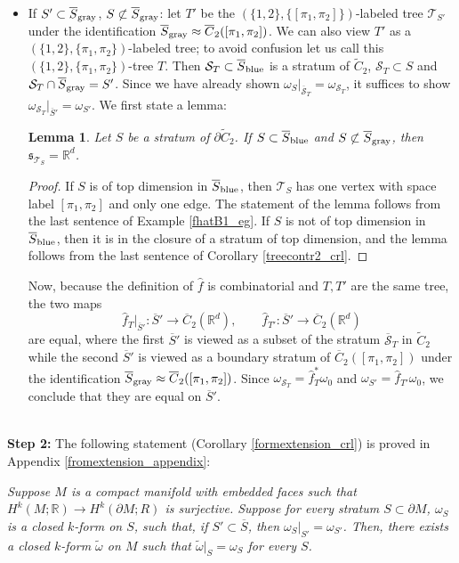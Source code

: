 \documentclass[11pt]{article}
\newtheorem{lmm}[thm]{Lemma}
\theoremstyle{definition}
\theoremstyle{remark}
\def\wt#1{\widetilde{#1}}
\def\ov#1{\overline{#1}}
\def\sgray{{\textnormal{gray}}}
\def\sblue{{\textnormal{blue}}}
\def\R{\mathbb{R}}
\def\fs{\mathfrak{s}}
\def\cT{\mathcal{T}}
\def\cS{\mathcal{S}}
\begin{document}
\begin{itemize}
\item If $S'\subset\ov{S}_{\sgray}$, $S\not\subset\ov{S}_{\sgray}$: 
let $T'$ be the $(\{1,2\},\{[\pi_1,\pi_2]\})$-labeled tree $\cT_{S'}$ under the identification $\ov{S}_{\sgray}\approx\ov{C}_2([\pi_1,\pi_2])$. 
We can also view $T'$ as a $(\{1,2\},\{\pi_1,\pi_2\})$-labeled tree; to avoid confusion let us call this $(\{1,2\},\{\pi_1,\pi_2\})$-tree $T$. 
Then $\cS_{T}\subset\ov{S}_{\sblue}$ is a stratum of $\wt{C}_2$, 
$\cS_{T}\subset S$ and $\cS_{T}\cap\ov{S}_{\sgray}=S'$. 
Since we have already shown $\omega_S|_{\ov{\cS}_{T}}=\omega_{\cS_{T}}$, it suffices to show $\omega_{\cS_{T}}|_{\ov{S}'}=\omega_{S'}$. 
We first state a lemma: 
\begin{lmm}\label{treecontr4_lmm}
Let $S$ be a stratum of $\partial\wt{C}_2$. 
If $S\subset\ov{S}_{\sblue}$ and $S\not\subset\ov{S}_{\sgray}$, then $\fs_{\cT_S}=\R^d$. 
\end{lmm}
\begin{proof}
If $S$ is of top dimension in $\ov{S}_{\sblue}$, then $\cT_S$ has one vertex with space label $[\pi_1,\pi_2]$ and only one edge. 
The statement of the lemma follows from the last sentence of Example \ref{fhatB1_eg}. 
If $S$ is not of top dimension in $\ov{S}_{\sblue}$, then it is in the closure of a stratum of top dimension, and the lemma follows from the last sentence of Corollary \ref{treecontr2_crl}. 
\end{proof}
Now, because the definition of $\hat{f}$ is combinatorial and $T,T'$ are the same tree, the two maps 
$$\hat{f}_{T}|_{\ov{S}'}:\ov{S}'\longrightarrow\ov{C}_2(\R^d),\qquad
\hat{f}_{T'}:\ov{S}'\longrightarrow\ov{C}_2(\R^d)$$
are equal, 
where the first $\ov{S}'$ is viewed as a subset of the stratum $\ov{\cS}_T$ in $\wt{C}_2$ while the second $\ov{S}'$ is viewed as a boundary stratum of $\ov{C}_2([\pi_1,\pi_2])$ under the identification 
$\ov{S}_{\sgray}\approx\ov{C}_2([\pi_1,\pi_2])$.
Since $\omega_{\cS_{T}}=\hat{f}_{T}^*\omega_0$ and $\omega_{S'}=\hat{f}_{T'}\omega_0$, we conclude that they are equal on $\ov{S}'$. 
\end{itemize}


~\\
{\bf Step 2:} The following statement (Corollary \ref{formextension_crl}) is proved in Appendix \ref{fromextension_appendix}: 

{\it Suppose $M$ is a compact manifold with embedded faces such that $H^k(M;\R)\to H^k(\partial M;R)$ is surjective. Suppose for every stratum $S\subset\partial{M}$, $\omega_S$ is a closed $k$-form on $S$, such that, if $S'\subset \ov{S}$, then $\omega_S|_{S'}=\omega_{S'}$. 
Then, there exists a closed $k$-form $\wt{\omega}$ on $M$ such that $\wt{\omega}|_{S}=\omega_S$ for every $S$.}
\end{document}
